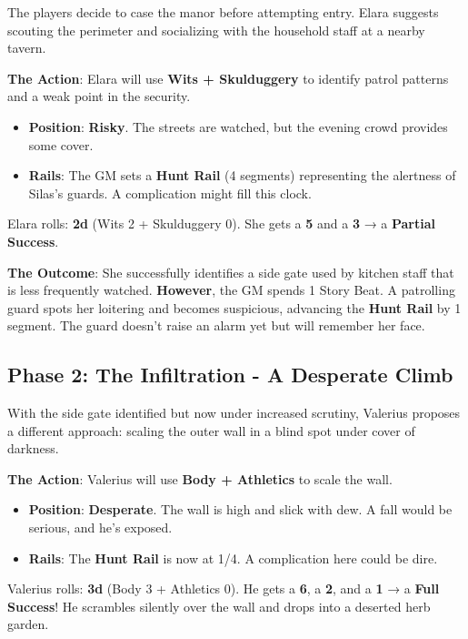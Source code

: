 The players decide to case the manor before attempting entry. Elara suggests scouting the perimeter and socializing with the household staff at a nearby tavern.

\textbf{The Action}: Elara will use \textbf{Wits + Skulduggery} to identify patrol patterns and a weak point in the security.

\begin{itemize}
    \item \textbf{Position}: \textbf{Risky}. The streets are watched, but the evening crowd provides some cover.
    \item \textbf{Rails}: The GM sets a \textbf{Hunt Rail} (4 segments) representing the alertness of Silas's guards. A complication might fill this clock.
\end{itemize}

Elara rolls: \textbf{2d} (Wits 2 + Skulduggery 0). She gets a \textbf{5} and a \textbf{3} → a \textbf{Partial Success}.

\textbf{The Outcome}: She successfully identifies a side gate used by kitchen staff that is less frequently watched. \textbf{However}, the GM spends 1 Story Beat. A patrolling guard spots her loitering and becomes suspicious, advancing the \textbf{Hunt Rail} by 1 segment. The guard doesn't raise an alarm yet but will remember her face.

\subsection*{Phase 2: The Infiltration - A Desperate Climb}

With the side gate identified but now under increased scrutiny, Valerius proposes a different approach: scaling the outer wall in a blind spot under cover of darkness.

\textbf{The Action}: Valerius will use \textbf{Body + Athletics} to scale the wall.

\begin{itemize}
    \item \textbf{Position}: \textbf{Desperate}. The wall is high and slick with dew. A fall would be serious, and he's exposed.
    \item \textbf{Rails}: The \textbf{Hunt Rail} is now at 1/4. A complication here could be dire.
\end{itemize}

Valerius rolls: \textbf{3d} (Body 3 + Athletics 0). He gets a \textbf{6}, a \textbf{2}, and a \textbf{1} → a \textbf{Full Success}! He scrambles silently over the wall and drops into a deserted herb garden.

